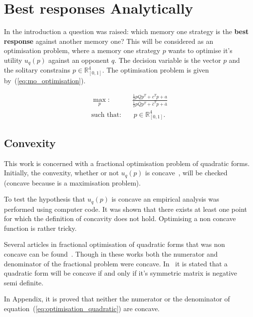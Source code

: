 \documentclass[10pt]{article}
\newcommand{\R}{\mathbb{R}}
\begin{document}
\section{Best responses Analytically}

In the introduction a question was raised: which memory one strategy is the \textbf{best response}
against another memory one? This will be considered as an optimisation problem,
where a memory one strategy \(p\) wants to optimise it's utility \(u_q(p)\)
against an opponent \(q\). The decision variable is the vector \(p\) and the
solitary constrains \(p \in \R^4_{[0, 1]} \). The optimisation problem is
given by~(\ref{eq:mo_optimisation}).

\begin{equation}\label{eq:mo_optimisation}
\begin{aligned}
& \max_p: && \frac{\frac{1}{2}  p  Q  p^T + c^T p + a} 
                  {\frac{1}{2}  p  \bar{Q}  p^T + \bar{c}^T  p + \bar{a}}
\\
& \text{such that}: && \ p \in \R^4_{[0, 1]}.
\end{aligned}
\end{equation}

\subsection{Convexity}

This work is concerned with a fractional optimisation problem of quadratic forms.
Initially, the convexity, whether or not \(u_{q}(p)\) is concave~\cite{Gradshteyn2007},
will be checked (concave because is a maximisation  problem).

To test the hypothesis that \(u_q(p)\) is concave an empirical analysis
was performed using computer code. %
It was shown that there exists at least one point for which the definition of
concavity does not hold. Optimising a non concave function is rather tricky.

Several articles in fractional optimisation of quadratic forms that was non concave
can be found~\cite{Beck2009, Hongyan2014}. Though in these works both the numerator
and denominator of the fractional problem were concave. In~\cite{Anton2014} it is
stated that a quadratic form will be concave if and only if it's symmetric matrix is
negative semi definite.

In Appendix, it is proved that neither the numerator or the denominator of
equation~(\ref{eq:optimisation_quadratic}) are concave.
\end{document}
